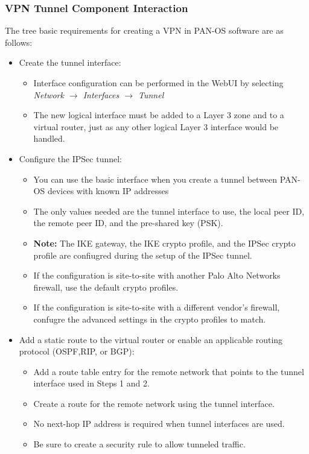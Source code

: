 \subsubsection{VPN Tunnel Component Interaction}
The tree basic requirements for creating a VPN in PAN-OS software are as follows:
\begin{itemize}
    \item Create the tunnel interface:
        \begin{itemize}
            \item Interface configuration can be performed in the WebUI by selecting \textit{Network $\rightarrow$ Interfaces $\rightarrow$ Tunnel}
            \item The new logical interface must be added to a Layer 3 zone and to a virtual router, just as any other logical Layer 3 interface would be handled.
        \end{itemize}
    \item Configure the IPSec tunnel:
        \begin{itemize}
            \item You can use the basic interface when you create a tunnel between PAN-OS devices with known IP addresses
            \item The only values needed are the tunnel interface to use, the local peer ID, the remote peer ID, and the pre-shared key (PSK).
            \item \textbf{Note:} The IKE gateway, the IKE crypto profile, and the IPSec crypto profile are confiugred during the setup of the IPSec tunnel.
            \item If the configuration is site-to-site with another Palo Alto Networks firewall, use the default crypto profiles.
            \item If the configuration is site-to-site with a different vendor's firewall, confugre the advanced settings in the crypto profiles to match.
        \end{itemize}
    \item Add a static route to the virtual router or enable an applicable routing protocol (OSPF,RIP, or BGP):
        \begin{itemize}
            \item Add a route table entry for the remote network that points to the tunnel interface used in Steps 1 and 2.
            \item Create a route for the remote network using the tunnel interface.
            \item No next-hop IP address is required when tunnel interfaces are used.
            \item Be sure to create a security rule to allow tunneled traffic.
        \end{itemize}
\end{itemize}

